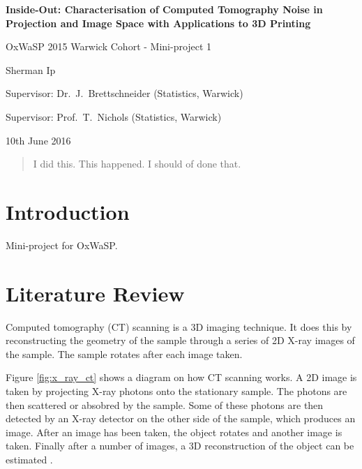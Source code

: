 \documentclass[12pt]{report}
\begin{document}
\begin{titlepage}
\centering
\vspace*{1cm}
        
        \LARGE
        \textbf{Inside-Out: Characterisation of Computed Tomography Noise in Projection and Image Space with Applications to 3D Printing}
        
		\large        
        
        \vspace{2cm}
        {OxWaSP 2015 Warwick Cohort - Mini-project 1}
        
        \vspace{1cm}
        {Sherman Ip}

        \vspace{1cm}
        {Supervisor: Dr.~J.~Brettschneider (Statistics, Warwick)}
        
        \vspace{1cm}
        {Supervisor: Prof.~T.~Nichols (Statistics, Warwick)}
        
        \vspace{1cm}
        {10th June 2016}
\end{titlepage}

\begin{abstract}
I did this. This happened. I should of done that.
\end{abstract}

\tableofcontents

\chapter{Introduction}
Mini-project for OxWaSP.

\chapter{Literature Review}
Computed tomography (CT) scanning is a 3D imaging technique. It does this by reconstructing the geometry of the sample through a series of 2D X-ray images of the sample. The sample rotates after each image taken.

Figure \ref{fig:x_ray_ct} shows a diagram on how CT scanning works. A 2D image is taken by projecting X-ray photons onto the stationary sample. The photons are then scattered or absobred by the sample.  Some of these photons are then detected by an X-ray detector on the other side of the sample, which produces an image. After an image has been taken, the object rotates and another image is taken. Finally after a number of images, a 3D reconstruction of the object can be estimated \cite{cantatore2011introduction}.
\end{document}
